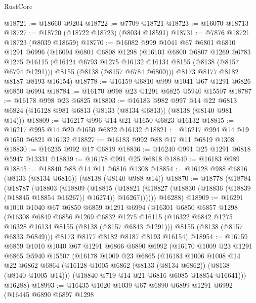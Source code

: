 \begin{lexlean}{RustCore}
\begin{coremodule}
@18721 := @18660 @9204
@18722 := @7709 @18721
@18723 := @16070 @18713
@18727 := @18720 (@18722 @18723) (@8034 @18591)
@18731 := @7876 @18721 @18723 (@8039 @18659)
@18770 := @16082
    @999
    @1041
    @67
    @6801
    @6810
    @1291
    @6996
    (@16094
      @6801
      @6808
      @1298
      (@16103
        @6800
        @6807
        @1269
        @6783
        @1275
        @16115
        (@16124 @6793 @1275 @16132 @16134 @8155 (@8138 (@8157 @6794 @1291)))
        @8155
        (@8138 (@8157 @6784 @6800)))
      @8173
      @8177
      @8182
      @8187
      @8193
      @16154)
@18778 := @16159 @6810 @999 @1041 @67 @1291 @6826 @6850 @6994
@18784 := @16170 @998 @23 @1291 @6825 @5940 @15507
@18787 := @16178 @998 @23 @6825
@18803 := @16183
    @982
    @997
    @14
    @22
    @6813
    @6824
    (@16128 @981 @6813 (@8133 (@8134 @6813)) (@8138 (@8140 @981 @14)))
@18809 := @16217 @996 @14 @21 @1650 @6823 @16132
@18815 := @16217 @995 @14 @20 @1650 @6822 @16132
@18821 := @16217 @994 @14 @19 @1650 @6821 @16132
@18827 := @16183 @992 @88 @17 @11 @6819 @1308
@18830 := @16235 @992 @17 @6819
@18836 := @16240 @991 @25 @1291 @6818 @5947 @13331
@18839 := @16178 @991 @25 @6818
@18840 := @16183 @989
@18845 := @18840 @88 @14 @11 @6816 @1308
@18854 := @16128 @988 @6816 (@8133 (@8134 @6816)) (@8138 (@8140 @988 @14))
@18870 := @18778
    (@18784
      (@18787
        (@18803
          (@18809
            (@18815
              (@18821 (@18827 (@18830 (@18836 (@18839 (@18845 @18854 @16267)) @16274)) @16267))))))
      @16288)
@18909 := @16291
    @1010
    @1040
    @67
    @6850
    @6859
    @1291
    @6994
    (@16301
      @6850
      @6857
      @1298
      (@16308
        @6849
        @6856
        @1269
        @6832
        @1275
        @16115
        (@16322 @6842 @1275 @16328 @16134 @8155 (@8138 (@8157 @6843 @1291)))
        @8155
        (@8138 (@8157 @6833 @6849)))
      @8173
      @8177
      @8182
      @8187
      @8193
      @16154)
@18954 := @16159
    @6859
    @1010
    @1040
    @67
    @1291
    @6866
    @6890
    @6992
    (@16170
      @1009
      @23
      @1291
      @6865
      @5940
      @15507
      (@16178
        @1009
        @23
        @6865
        (@16183
          @1006
          @1008
          @14
          @22
          @6862
          @6864
          (@16128 @1005 @6862 (@8133 (@8134 @6862)) (@8138 (@8140 @1005 @14)))
          (@18840 @719 @14 @21 @6816 @6085 @18854 @16641)))
      @16288)
@18993 := @16435
    @1020
    @1039
    @67
    @6890
    @6899
    @1291
    @6992
    (@16445
      @6890
      @6897
      @1298

\end{coremodule}
\end{lexlean}
